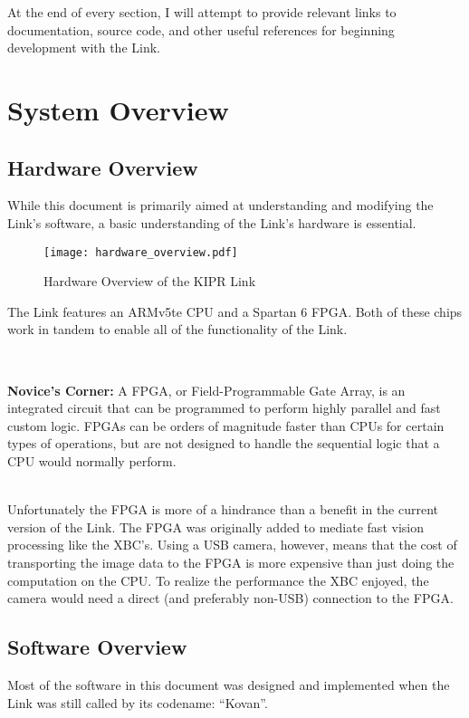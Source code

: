 \documentclass[12pt,letterpaper]{article}
\newcommand{\bcolorbox}[4]{\noindent \\ \fcolorbox{#1}{#2} {\parbox{\textwidth}{\vspace{.1em}\textbf{#3} #4\vspace{.1em}}} \\}
\newcommand{\novice}[1]{\bcolorbox{green}{Honeydew}{Novice's Corner:}{#1}}
\begin{document}
	At the end of every section, I will attempt to provide relevant links to documentation, source code, and other useful references
	for beginning development with the Link.
	
	\section{System Overview}
	
	\subsection{Hardware Overview}
	
	While this document is primarily aimed at understanding and modifying the Link's software, a basic understanding of
	the Link's hardware is essential.
	
	\begin{figure}[H]
		\begin{center}
			\texttt{[image: hardware\_overview.pdf]}
			\caption{Hardware Overview of the KIPR Link}
		\end{center}
	\end{figure}
	
	The Link features an ARMv5te CPU and a Spartan 6 FPGA. Both of these chips work in tandem to enable all of the functionality
	of the Link.
	
	\novice{A FPGA, or Field-Programmable Gate Array, is an integrated circuit that can be programmed to perform highly parallel and fast
	custom logic. FPGAs can be orders of magnitude faster than CPUs for certain types of operations, but are not designed to handle the
	sequential logic that a CPU would normally perform.}
	
	Unfortunately the FPGA is more of a hindrance than a benefit in the current version of the Link. The FPGA was originally added to
	mediate fast vision processing like the XBC's. Using a USB camera, however, means that the cost of transporting the image data to the
	FPGA is more expensive than just doing the computation on the CPU. To realize the performance the XBC enjoyed, the camera would need
	a direct (and preferably non-USB) connection to the FPGA.
	
	\subsection{Software Overview}
	
	Most of the software in this document was designed and implemented when the Link was still called by its codename: ``Kovan''.
	
\end{document}
